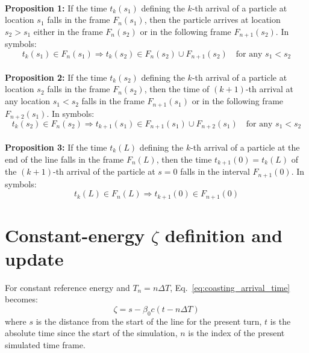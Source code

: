 ~\\
\textbf{Proposition 1:} If the time $t_k(s_1)$ defining the $k$-th arrival of a particle at location $s_1$ falls in the frame $F_n(s_1)$, then the particle arrives at location $s_2 > s_1$ either in the frame $F_n(s_2)$ or in the following frame $F_{n+1}(s_2)$. In symbols:
\begin{equation}
t_k(s_1) \in F_n(s_1) \Rightarrow t_k(s_2) \in F_n(s_2) \cup  F_{n+1}(s_2) \quad \text{for any } s_1 < s_2
\end{equation}
~\\
\textbf{Proposition 2:} If the time $t_k(s_2)$ defining the $k$-th arrival of a particle at location $s_2$ falls in the frame $F_n(s_2)$, then the time of $(k+1)$-th arrival at any location $s_1 < s_2$ falls in the frame $F_{n+1}(s_1)$ or in the following frame $F_{n+2}(s_1)$. In symbols:
\begin{equation}
t_k(s_2) \in F_n(s_2) \Rightarrow t_{k+1}(s_1) \in F_{n+1}(s_1) \cup  F_{n+2}(s_1) \quad \text{for any } s_1 < s_2
\end{equation}
~\\
\textbf{Proposition 3:} If the time $t_k(L)$ defining the $k$-th arrival of a particle at the end of the line falls in the frame $F_n(L)$, then the time $t_{k+1}(0) = t_k(L)$ of the $(k+1)$-th arrival of the particle at $s=0$ falls in the interval
$F_{n+1}(0)$. In symbols:
\begin{equation}
t_k(L) \in F_n(L) \Rightarrow t_{k+1}(0) \in F_{n+1}(0)
\end{equation}

\section{Constant-energy $\zeta$ definition and update}

For constant reference energy and $T_n=n\Delta T$, Eq.~\ref{eq:coasting_arrival_time} becomes:
\begin{equation}
\zeta = s  - \beta_0 c (t - n\Delta T)
\end{equation}
where $s$ is the distance from the start of the line for the present turn, $t$ is the absolute time since the start of the simulation, $n$ is the index of the present simulated time frame.


